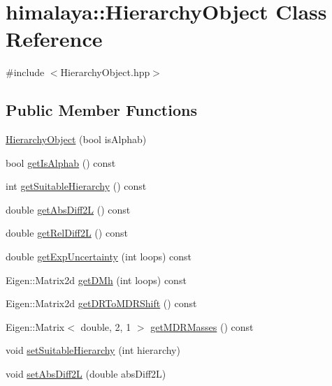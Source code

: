 \hypertarget{classhimalaya_1_1HierarchyObject}{}\section{himalaya\+:\+:Hierarchy\+Object Class Reference}
\label{classhimalaya_1_1HierarchyObject}


{\ttfamily \#include $<$Hierarchy\+Object.\+hpp$>$}

\subsection*{Public Member Functions}
\begin{DoxyCompactItemize}
\item 
\hyperlink{classhimalaya_1_1HierarchyObject_aba8877b52224daf85c7fbe52620162e5}{Hierarchy\+Object} (bool is\+Alphab)
\item 
bool \hyperlink{classhimalaya_1_1HierarchyObject_a1666f351914e563ac910afc552a6932a}{get\+Is\+Alphab} () const 
\item 
int \hyperlink{classhimalaya_1_1HierarchyObject_aa22fec3eb13eb3302fd7034d87dc91db}{get\+Suitable\+Hierarchy} () const 
\item 
double \hyperlink{classhimalaya_1_1HierarchyObject_a9dd4da9b49984440fe2c8cbcd0f0c5d8}{get\+Abs\+Diff2L} () const 
\item 
double \hyperlink{classhimalaya_1_1HierarchyObject_a8f37a14669ca0890edce34836d119073}{get\+Rel\+Diff2L} () const 
\item 
double \hyperlink{classhimalaya_1_1HierarchyObject_a28ec351fd97a6c0de44ae51ce7415033}{get\+Exp\+Uncertainty} (int loops) const 
\item 
Eigen\+::\+Matrix2d \hyperlink{classhimalaya_1_1HierarchyObject_a81e50f8e67ccb1055088b0d7ed591205}{get\+D\+Mh} (int loops) const 
\item 
Eigen\+::\+Matrix2d \hyperlink{classhimalaya_1_1HierarchyObject_a992a8b0156296168ca71b6701ab1b1b7}{get\+D\+R\+To\+M\+D\+R\+Shift} () const 
\item 
Eigen\+::\+Matrix$<$ double, 2, 1 $>$ \hyperlink{classhimalaya_1_1HierarchyObject_aa2cfb844949191ab509bd645a75b6259}{get\+M\+D\+R\+Masses} () const 
\item 
void \hyperlink{classhimalaya_1_1HierarchyObject_a6f77f9c7f9173858089e83bcaa8362f2}{set\+Suitable\+Hierarchy} (int hierarchy)
\item 
void \hyperlink{classhimalaya_1_1HierarchyObject_a48341b55e1bb9270c7666a3be8f4d0fd}{set\+Abs\+Diff2L} (double abs\+Diff2L)

\end{DoxyCompactItemize}

